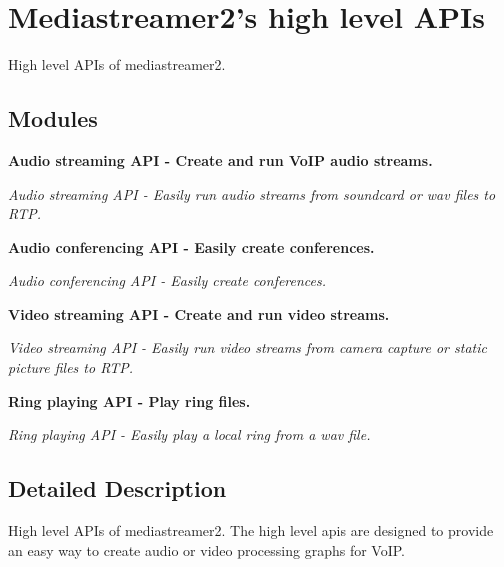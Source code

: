 \section{Mediastreamer2's high level A\-P\-Is}
\label{group__mediastreamer2__high__api}


High level A\-P\-Is of mediastreamer2.  


\subsection*{Modules}
\begin{DoxyCompactItemize}
\item 
{\bf Audio streaming A\-P\-I -\/ Create and run Vo\-I\-P audio streams.}
\begin{DoxyCompactList}\small\item\em Audio streaming A\-P\-I -\/ Easily run audio streams from soundcard or wav files to R\-T\-P. \end{DoxyCompactList}\item 
{\bf Audio conferencing A\-P\-I -\/ Easily create conferences.}
\begin{DoxyCompactList}\small\item\em Audio conferencing A\-P\-I -\/ Easily create conferences. \end{DoxyCompactList}\item 
{\bf Video streaming A\-P\-I -\/ Create and run video streams.}
\begin{DoxyCompactList}\small\item\em Video streaming A\-P\-I -\/ Easily run video streams from camera capture or static picture files to R\-T\-P. \end{DoxyCompactList}\item 
{\bf Ring playing A\-P\-I -\/ Play ring files.}
\begin{DoxyCompactList}\small\item\em Ring playing A\-P\-I -\/ Easily play a local ring from a wav file. \end{DoxyCompactList}\end{DoxyCompactItemize}


\subsection{Detailed Description}
High level A\-P\-Is of mediastreamer2. The high level apis are designed to provide an easy way to create audio or video processing graphs for Vo\-I\-P. 